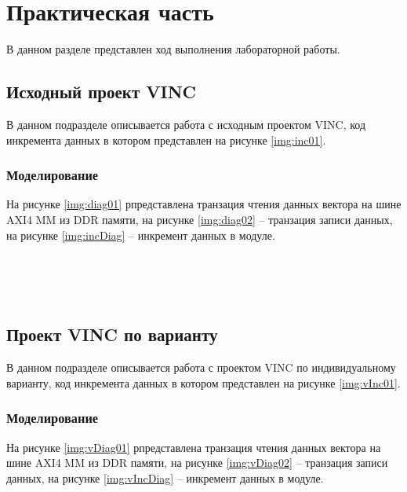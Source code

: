 \chapter{Практическая часть}

В данном разделе представлен ход выполнения лабораторной работы.

\section{Исходный проект VINC}

В данном подразделе описывается работа с исходным проектом VINC, код инкремента
данных в котором представлен на рисунке \ref{img:inc01}.


\subsection{Моделирование}

На рисунке \ref{img:diag01} рпредставлена транзация чтения данных вектора на
шине AXI4 MM из DDR памяти, на рисунке \ref{img:diag02} -- транзация записи
данных, на рисунке \ref{img:incDiag} -- инкремент данных в модуле.



~\\
~\\
~\\

\section{Проект VINC по варианту}

В данном подразделе описывается работа с проектом VINC по индивидуальному
варианту, код инкремента данных в котором представлен на рисунке
\ref{img:vInc01}.


\subsection{Моделирование}

На рисунке \ref{img:vDiag01} рпредставлена транзация чтения данных вектора на
шине AXI4 MM из DDR памяти, на рисунке \ref{img:vDiag02} -- транзация записи
данных, на рисунке \ref{img:vIncDiag} -- инкремент данных в модуле.

